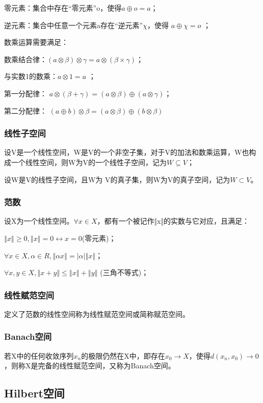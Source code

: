\documentclass{article}
\begin{document}
零元素：集合中存在“零元素”o，使得$a \oplus o = a $；

逆元素：集合中任意一个元素a存在“逆元素”$\chi$，使得 $a\oplus \chi = o$ ；

数乘运算需要满足：

数乘结合律：$(a \otimes \beta ) \otimes \gamma= a \otimes (\beta \times \gamma)$；

与实数1的数乘：$a \otimes 1= a$ ；

第一分配律： $a \otimes (\beta + \gamma) = (a \otimes \beta) \oplus (a \otimes \gamma ) $；

第二分配律： $(a \oplus b) \otimes \beta = (a \otimes \beta) \oplus (b \otimes \beta )$

\subsubsection{线性子空间}
设V是一个线性空间，W是V的一个非空子集，对于V的加法和数乘运算，W也构成一个线性空间，则W为V的一个线性子空间，记为$W\subseteq V$；

设W是V的线性子空间，且W为 V的真子集，则W为V的真子空间，记为$W\subset V$。

\subsubsection{范数}
设X为一个线性空间。$\forall x \in X$，都有一个被记作‖x‖的实数与它对应，且满足：

$‖x‖\ge 0, ‖x‖=0 \leftrightarrow x=0 $(零元素)；

$\forall x\in X, \alpha\in R,  ‖\alpha x‖=|\alpha|‖x‖$；

$\forall x,y\in X, ‖x+y‖\le‖x‖+‖y‖$ (三角不等式)；

\subsubsection{线性赋范空间}
定义了范数的线性空间称为线性赋范空间或简称赋范空间。

\subsubsection{Banach空间}
若X中的任何收敛序列${x_n}$的极限仍然在X中，即存在$x_0\longrightarrow X$，使得$d(x_n,x_0)\longrightarrow 0$，则称X是完备的线性赋范空间，又称为Banach空间。

\subsection{Hilbert空间}
\end{document}
